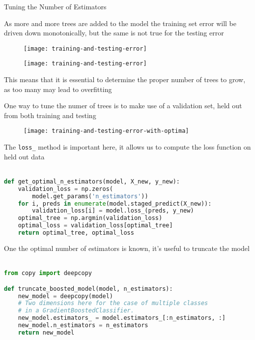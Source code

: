 %
\begin{frame}{Tuning the Number of Estimators}

As more and more trees are added to the model the training set error will be driven down monotonically, but the same is not true for the testing error

  \begin{figure}
    \texttt{[image: training-and-testing-error]}
  \end{figure}

\end{frame}
%
\begin{frame}

  \begin{figure}
    \texttt{[image: training-and-testing-error]}
  \end{figure}

This means that it is essential to determine the proper number of trees to grow, as too many may lead to overfitting

\end{frame}
%
\begin{frame}
One way to tune the numer of trees is to make use of a validation set, held out from both training and testing

  \begin{figure}
    \texttt{[image: training-and-testing-error-with-optima]}
  \end{figure}
  
\end{frame}
%
\begin{frame}[fragile]
The \texttt{loss\_} method is important here, it allows us to compute the loss function on held out data\\~\\

\begin{lstlisting}[language=python]
def get_optimal_n_estimators(model, X_new, y_new):
    validation_loss = np.zeros(
        model.get_params('n_estimators'))
    for i, preds in enumerate(model.staged_predict(X_new)):
        validation_loss[i] = model.loss_(preds, y_new)    
    optimal_tree = np.argmin(validation_loss)
    optimal_loss = validation_loss[optimal_tree]
    return optimal_tree, optimal_loss
\end{lstlisting}

\end{frame}
%
\begin{frame}[fragile]
One the optimal number of estimators is known, it's useful to truncate the model\\~\\

\begin{lstlisting}[language=python]
from copy import deepcopy

def truncate_boosted_model(model, n_estimators):
    new_model = deepcopy(model)
    # Two dimensions here for the case of multiple classes
    # in a GradientBoostedClassifier.
    new_model.estimators_ = model.estimators_[:n_estimators, :]
    new_model.n_estimators = n_estimators
    return new_model
\end{lstlisting}

\end{frame}
